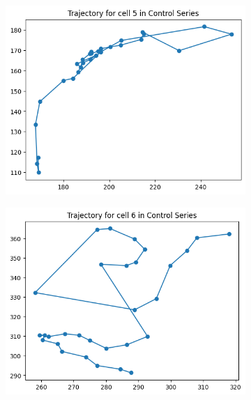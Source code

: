 \documentclass{article}
\begin{document}
\clearpage
\begin{figure}[h!]
    \centering
    \begin{subfigure}[b]{0.5\linewidth}
        \centering
        \includegraphics[width=\linewidth]{Report/Appendix_Images/Trajectory-A-Control/trajectory_5.png}
        \caption{}
    \end{subfigure}%
    \begin{subfigure}[b]{0.5\linewidth}
        \centering
        \includegraphics[width=\linewidth]{Report/Appendix_Images/Trajectory-A-Control/trajectory_6.png}
        \caption{}
    \end{subfigure}
    \begin{subfigure}[b]{0.5\linewidth}

\end{subfigure}
\end{figure}
\end{document}
